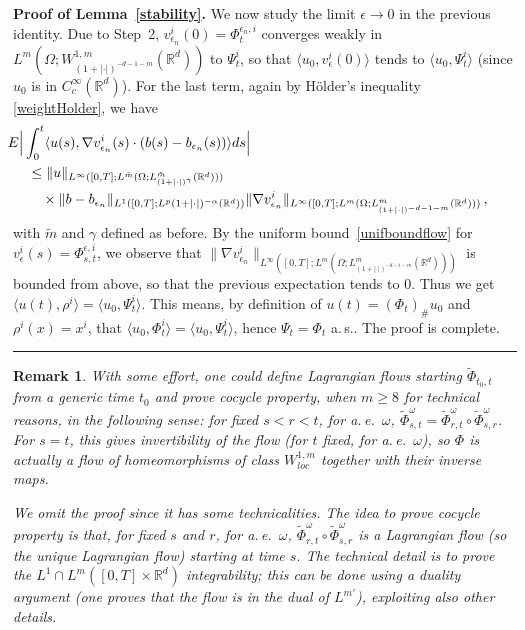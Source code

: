 \documentclass[a4paper,10pt]{article}
\newtheorem{remark}[theorem]{Remark}
\newenvironment{proof}[1][Proof]{\noindent\textbf{#1.} }{\ \rule{0.5em}{0.5em}}
\newcommand{\mr}{\mathbb{R}}
\newcommand{\lan}{\langle}
\newcommand{\ran}{\rangle}
\newcommand{\td}{\tilde}
\newcommand{\eps}{\epsilon}
\begin{document}
\begin{proof}[Proof of Lemma~\ref{stability}]
We now study the limit $\eps \to 0$ in the previous identity. Due to Step~2, $v^{i}_{\eps_n}(0)=\Phi^{\eps_n,i}_t$ converges weakly in $L^m(\Omega;W^{1,m}_{(1+|\cdot|)^{-d-1-m}}(\mr^d))$ to $\Psi^i_t$, so that $\lan u_0,v^{i}_\eps(0)\ran$ tends to $\lan u_0,\Psi^i_t\ran$ (since $u_0$ is in $C^\infty_c(\mr^d)$). For the last term, again by H\"older's inequality \eqref{weightHolder}, we have
\begin{align*}
\lefteqn{ \hspace{-0.5cm} E\Big|\int^t_0\lan u(s),\nabla v^{i}_{\eps_n}(s)\cdot(b(s)-b_{\eps_n}(s))\ran ds\Big|}\\
  &\le  \|u\|_{L^\infty([0,T];L^{\td{m}}(\Omega;L^{\td{m}}_{(1+|\cdot|)^\gamma}(\mr^d)))} \\
  & \quad {}\times  \|b-b_{\eps_n}\|_{L^1([0,T];L^p{(1+|\cdot|)^{-\alpha}}(\mr^d))} \|\nabla v^{i}_{\eps_n}\|_{L^\infty([0,T];L^{m}(\Omega;L^{m}_{(1+|\cdot|)^{-d-1-m}}(\mr^d)))} \,,
\end{align*}
with $\td{m}$ and $\gamma$ defined as before. By the uniform bound~\eqref{unifboundflow} for $v^{i}_\eps(s)=\Phi^{\eps,i}_{s,t}$, we observe that $\|\nabla v^{i}_{\eps_n}\|_{L^\infty([0,T];L^{m}(\Omega;L^{m}_{(1+|\cdot|)^{-d-1-m}}(\mr^d)))}$ is bounded from above, so that the previous expectation tends to $0$. Thus we get $\lan u(t),\rho^i\ran= \lan u_0,\Psi^i_t\ran$. This means, by definition of $u(t)=(\Phi_t)_\#u_0$ and $\rho^i(x)=x^i$, that $\lan u_0,\Phi^i_t\ran=\lan u_0,\Psi^i_t\ran$, hence $\Psi_t=\Phi_t$ a.\,s.. The proof is complete.
\end{proof}

\begin{remark}
With some effort, one could define Lagrangian flows starting $\td{\Phi}_{t_0,t}$ from a generic time $t_0$ and prove cocycle property, when $m\ge8$ for technical reasons, in the following sense: for fixed $s<r<t$, for a.\,e.\ $\omega$, $\td{\Phi}^\omega_{s,t}=\td{\Phi}^\omega_{r,t}\circ\td{\Phi}^\omega_{s,r}$. For $s=t$, this gives invertibility of the flow (for $t$ fixed, for a.\,e.\ $\omega$), so $\Phi$ is actually a flow of homeomorphisms of class $W^{1,m}_{loc}$ together with their inverse maps.

We omit the proof since it has some technicalities. The idea to prove cocycle property is that, for fixed $s$ and $r$, for a.\,e.\ $\omega$, $\td{\Phi}^\omega_{r,t}\circ\td{\Phi}^\omega_{s,r}$ is a Lagrangian flow (so the unique Lagrangian flow) starting at time $s$. The technical detail is to prove the $L^1\cap L^m([0,T]\times\mr^d)$ integrability; this can be done using a duality argument (one proves that the flow is in the dual of $L^{m'}$), exploiting also other details.
\end{remark}
\end{document}

